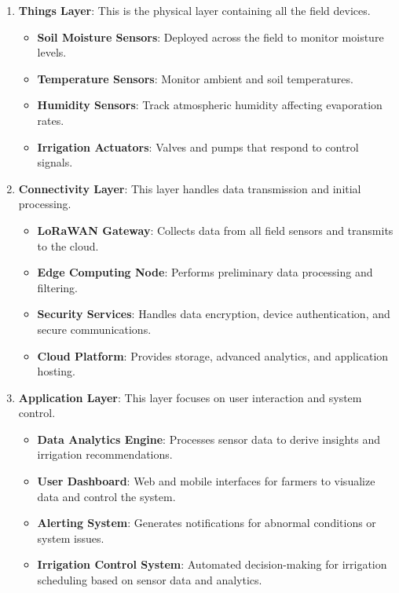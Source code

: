 \documentclass[12pt,a4paper]{article}
\begin{document}
\begin{enumerate}
    \item \textbf{Things Layer}: This is the physical layer containing all the field devices.
    \begin{itemize}
        \item \textbf{Soil Moisture Sensors}: Deployed across the field to monitor moisture levels.
        \item \textbf{Temperature Sensors}: Monitor ambient and soil temperatures.
        \item \textbf{Humidity Sensors}: Track atmospheric humidity affecting evaporation rates.
        \item \textbf{Irrigation Actuators}: Valves and pumps that respond to control signals.
    \end{itemize}
    
    \item \textbf{Connectivity Layer}: This layer handles data transmission and initial processing.
    \begin{itemize}
        \item \textbf{LoRaWAN Gateway}: Collects data from all field sensors and transmits to the cloud.
        \item \textbf{Edge Computing Node}: Performs preliminary data processing and filtering.
        \item \textbf{Security Services}: Handles data encryption, device authentication, and secure communications.
        \item \textbf{Cloud Platform}: Provides storage, advanced analytics, and application hosting.
    \end{itemize}
    
    \item \textbf{Application Layer}: This layer focuses on user interaction and system control.
    \begin{itemize}
        \item \textbf{Data Analytics Engine}: Processes sensor data to derive insights and irrigation recommendations.
        \item \textbf{User Dashboard}: Web and mobile interfaces for farmers to visualize data and control the system.
        \item \textbf{Alerting System}: Generates notifications for abnormal conditions or system issues.
        \item \textbf{Irrigation Control System}: Automated decision-making for irrigation scheduling based on sensor data and analytics.
    \end{itemize}
\end{enumerate}
\end{document}
